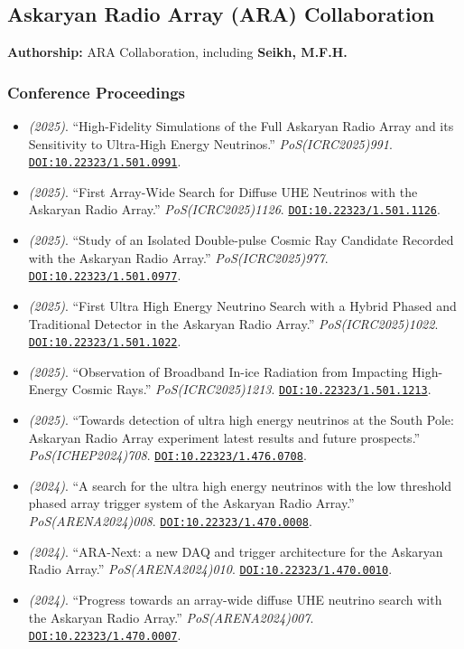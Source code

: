 \begingroup
\setlength{\emergencystretch}{2em}
\renewcommand{\doi}[1]{\href{https://doi.org/#1}{\nolinkurl{DOI:#1}}.}
\subsection{Askaryan Radio Array (ARA) Collaboration}
\textbf{Authorship:} ARA Collaboration, including \textbf{Seikh, M.F.H.}
\subsubsection{Conference Proceedings}
\begin{itemize}
\item \textit{(2025)}. ``High-Fidelity Simulations of the Full Askaryan Radio Array and its Sensitivity to Ultra-High Energy Neutrinos.'' \textit{PoS(ICRC2025)991}. \doi{10.22323/1.501.0991} 
\item \textit{(2025)}. ``First Array-Wide Search for Diffuse UHE Neutrinos with the Askaryan Radio Array.'' \textit{PoS(ICRC2025)1126}. \doi{10.22323/1.501.1126} 
\item \textit{(2025)}. ``Study of an Isolated Double-pulse Cosmic Ray Candidate Recorded with the Askaryan Radio Array.'' \textit{PoS(ICRC2025)977}. \doi{10.22323/1.501.0977} 
\item \textit{(2025)}. ``First Ultra High Energy Neutrino Search with a Hybrid Phased and Traditional Detector in the Askaryan Radio Array.'' \textit{PoS(ICRC2025)1022}. \doi{10.22323/1.501.1022} 
\item \textit{(2025)}. ``Observation of Broadband In-ice Radiation from Impacting High-Energy Cosmic Rays.'' \textit{PoS(ICRC2025)1213}. \doi{10.22323/1.501.1213} 
\item \textit{(2025)}. ``Towards detection of ultra high energy neutrinos at the South Pole: Askaryan Radio Array experiment latest results and future prospects.'' \textit{PoS(ICHEP2024)708}. \doi{10.22323/1.476.0708}
\item \textit{(2024)}. ``A search for the ultra high energy neutrinos with the low threshold phased array trigger system of the Askaryan Radio Array.'' \textit{PoS(ARENA2024)008}. \doi{10.22323/1.470.0008} 
\item \textit{(2024)}. ``ARA-Next: a new DAQ and trigger architecture for the Askaryan Radio Array.'' \textit{PoS(ARENA2024)010}. \doi{10.22323/1.470.0010} 
\item \textit{(2024)}. ``Progress towards an array-wide diffuse UHE neutrino search with the Askaryan Radio Array.'' \textit{PoS(ARENA2024)007}. \doi{10.22323/1.470.0007} 

\end{itemize}
